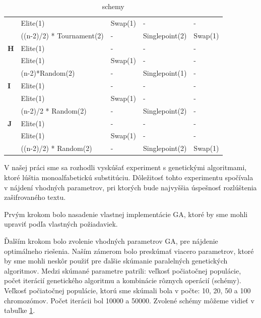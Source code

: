 \begin{table}[!h]
\begin{tabular}{@{}lllll@{}}
                & Elite(1)                  & Swap(1)          & -                 & -                    \\
                & ((n-2)/2) * Tournament(2) & -                & Singlepoint(2)    & Swap(1)              \\ \midrule
\textbf{H}      & Elite(1)                  & -                & -                 & -                    \\
                & Elite(1)                  & Swap(1)          & -                 & -                    \\
                & (n-2)*Random(2)           & -                & Singlepoint(1)    & -                    \\ \midrule
\textbf{I}      & Elite(1)                  & -                & -                 & -                    \\
                & Elite(1)                  & Swap(1)          & -                 & -                    \\
                & (n-2)/2 * Random(2)       & -                & Singlepoint(2)    & -                    \\ \midrule
\textbf{J}      & Elite(1)                  & -                & -                 & -                    \\
                & Elite(1)                  & Swap(1)          & -                 & -                    \\
                & ((n-2)/2) * Random(2)     & -                & Singlepoint(2)    & Swap(1)              \\ \bottomrule
\end{tabular}
\caption{schemy}
\label{tab:schemy}
\end{table}

V našej práci sme sa rozhodli vyskúšať experiment s genetickými algoritmami, ktoré lúštia monoalfabetickú substitúciu.
Dôležitosť tohto experimentu spočívala v nájdení vhodných parametrov, pri ktorých bude najvyššia úspešnosť rozlúštenia zašifrovaného textu.

Prvým krokom bolo nasadenie vlastnej implementácie GA, ktoré by sme mohli upraviť podľa vlastných požiadaviek.

Ďalším krokom bolo zvolenie vhodných parametrov GA, pre nájdenie optimálneho riešenia.
Naším zámerom bolo preskúmať viacero parametrov, ktoré by sme mohli neskôr použiť pre ďalšie skúmanie paralelných genetických algoritmov. 
Medzi skúmané parametre patrili: veľkosť počiatočnej populácie, počet iterácií genetického algoritmu a kombinácie rôznych operácií (schémy).
Veľkosť počiatočnej populácie, ktorú sme skúmali bola v počte: 10, 20, 50 a 100 chromozómov. Počet iterácii bol 10000 a 50000. 
Zvolené schémy môžeme vidieť v tabuľke \ref{tab:schemy}.

